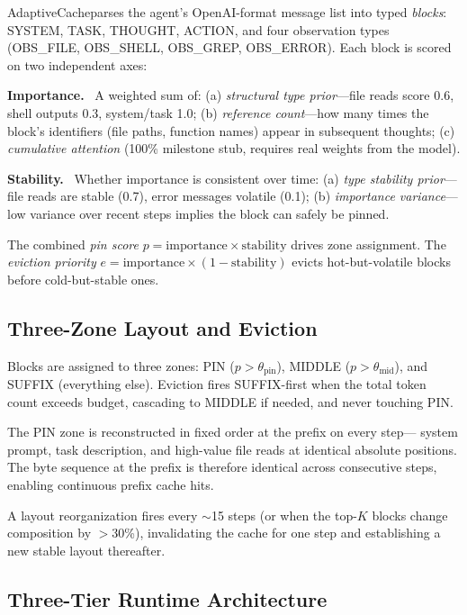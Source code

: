 \documentclass[letterpaper,twocolumn,10pt]{article}
\newcommand{\sysname}{AdaptiveCache}
\newcommand{\para}[1]{\smallskip\noindent\textbf{#1.}\ }
\begin{document}
\sysname parses the agent's OpenAI-format message list into typed
\emph{blocks}: SYSTEM, TASK, THOUGHT, ACTION, and four observation types
(OBS\_FILE, OBS\_SHELL, OBS\_GREP, OBS\_ERROR). Each block is scored on
two independent axes:

\para{Importance} A weighted sum of: (a) \emph{structural type prior}---file
reads score 0.6, shell outputs 0.3, system/task 1.0; (b) \emph{reference
count}---how many times the block's identifiers (file paths, function names)
appear in subsequent thoughts; (c) \emph{cumulative attention}
(100\% milestone stub, requires real weights from the model).

\para{Stability} Whether importance is consistent over time: (a)
\emph{type stability prior}---file reads are stable (0.7), error messages
volatile (0.1); (b) \emph{importance variance}---low variance over recent
steps implies the block can safely be pinned.

The combined \emph{pin score} $p = \text{importance} \times \text{stability}$
drives zone assignment. The \emph{eviction priority}
$e = \text{importance} \times (1-\text{stability})$ evicts hot-but-volatile
blocks before cold-but-stable ones.

\subsection{Three-Zone Layout and Eviction}

Blocks are assigned to three zones: PIN ($p > \theta_\text{pin}$),
MIDDLE ($p > \theta_\text{mid}$), and SUFFIX (everything else). Eviction
fires SUFFIX-first when the total token count exceeds budget, cascading to
MIDDLE if needed, and never touching PIN.

The PIN zone is reconstructed in fixed order at the prefix on every step---
system prompt, task description, and high-value file reads at identical
absolute positions. The byte sequence at the prefix is therefore identical
across consecutive steps, enabling continuous prefix cache hits.

A layout reorganization fires every $\sim$15 steps (or when the top-$K$
blocks change composition by $>$30\%), invalidating the cache for one step
and establishing a new stable layout thereafter.

\subsection{Three-Tier Runtime Architecture}
\end{document}
